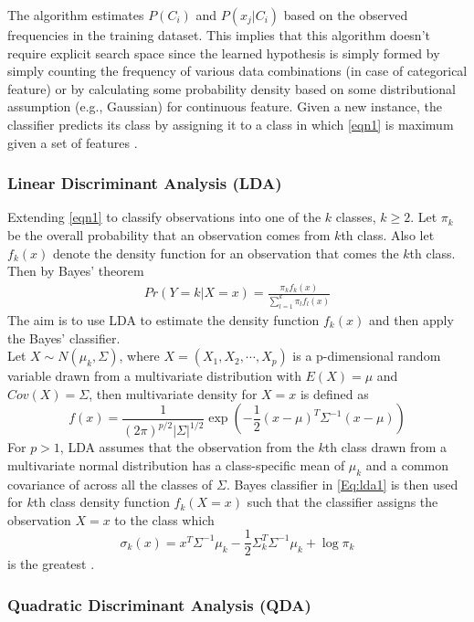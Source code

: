 \noindent The algorithm estimates $P(C_i)$ and $P(x_j|C_i)$ based on the observed frequencies in the training dataset. This implies that this algorithm doesn't require explicit search space since the learned hypothesis is simply formed by simply counting the frequency of various data combinations (in case of categorical feature) or by calculating some probability density based on some distributional assumption (e.g., Gaussian) for continuous feature. Given a new instance, the classifier predicts its class by assigning it to a class in which \autoref{eqn1} is maximum given a set of features \citep{mitchell1990machine}.

\subsubsection{Linear Discriminant Analysis (LDA)}

Extending \autoref{eqn1} to classify observations into one of the $k$ classes, $k\geq2$. Let $\pi_k$ be the overall probability that an observation comes from $k$th class. Also let $f_k(x)$ denote the density function for an observation that comes the $k$th class. Then by Bayes' theorem
\begin{align}
Pr(Y=k|X=x)=\frac{\pi_kf_k(x)}{\sum^k_{l=1}\pi_lf_l(x)}\label{Eq:lda1}
\end{align}
The aim is to use LDA to estimate the density function $f_k(x)$ and then apply the Bayes' classifier.\\

\noindent Let $X\sim N(\mu_k, \Sigma)$, where $X = (X_1, X_2, \cdots, X_p)$ is a p-dimensional random variable drawn from a multivariate distribution with $E(X) = \mu$ and $Cov(X) = \Sigma$, then multivariate density for $X=x$ is defined as
\[
f(x) = \frac{1}{(2\pi)^{p/2}|\Sigma|^{1/2}}\exp\left(-\frac{1}{2}(x-\mu)^T\Sigma^{-1}(x-\mu)\right)
\]
For $p>1$, LDA assumes that the observation from the $k$th class drawn from a multivariate normal distribution has a class-specific mean of $\mu_k$ and a common covariance of across all the classes of $\Sigma$. Bayes classifier in \autoref{Eq:lda1} is then used for $k$th class density function $f_k(X=x)$ such that the classifier assigns the observation $X=x$ to the class which
\[
\sigma_k(x) = x^T\Sigma^{-1}\mu_k - \frac{1}{2}\Sigma^T_{k}\Sigma^{-1}\mu_k + \log\pi_k
\]
is the greatest \citep{james2013introduction}.

\subsubsection{Quadratic Discriminant Analysis (QDA)}

